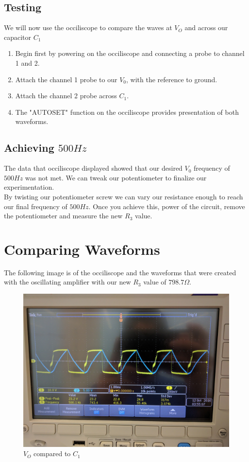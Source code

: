 \documentclass[12pt]{article}
\begin{document}
\subsection{Testing}
We will now use the occiliscope to compare the waves at $V_O$ and across our capacitor $C_1$
\begin{enumerate}
	\item Begin first by powering on the occiliscope and connecting a probe to channel 1 and 2.
	\item Attach the channel 1 probe to our $V_0$, with the reference to ground.
	\item Attach the channel 2 probe across $C_1$.
	\item The "AUTOSET" function on the occiliscope provides presentation of both waveforms.
\end{enumerate}
\subsection{Achieving $500Hz$}
The data that occiliscope displayed showed that our desired $V_0$ frequency of $500Hz$ was not met. We can tweak our potentiometer to finalize our experimentation.
\\
By twisting our potentiometer screw we can vary our resistance enough to reach our final frequency of $500Hz$. Once you achieve this, power of the circuit, remove the potentiometer and measure the new $R_3$ value.

\newpage
\section{Comparing Waveforms}
The following image is of the occiliscope and the waveforms that were created with the oscillating amplifier with our new $R_3$ value of $798.7\Omega$.
\begin{figure}[!h]
	\label{fig:amp}
	\caption{$V_O$ compared to $C_1$}
	\centering
	\includegraphics[width=1\textwidth]{waveform}
\end{figure}
\end{document}
